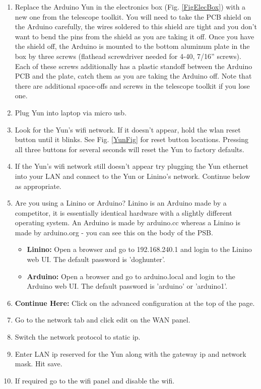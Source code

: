 \documentclass[11pt]{article}
\begin{document}
\label{secYun}
\begin{enumerate}
\item Replace the Arduino Yun in the electronics box (Fig. \ref{FigElecBox}) with a new one from the telescope toolkit.
	You will need to take the PCB shield on the Arduino carefully, the wires soldered to this shield are tight and you don't want to bend the pins from the shield as you are taking it off.
	Once you have the shield off, the Arduino is mounted to the bottom aluminum plate in the box by three screws (flathead screwdriver needed for 4-40, 7/16'' screws).  
	Each of these screws additionally has a plastic standoff between the Arduino PCB and the plate, catch them as you are taking the Arduino off.
	Note that there are additional space-offs and screws in the telescope toolkit if you lose one.
\item Plug Yun into laptop via micro usb.
\item Look for the Yun's wifi network. If it doesn't appear, hold the wlan reset button until it blinks. 
	See Fig. \ref{YunFig} for reset button locations.
	Pressing all three buttons for several seconds will reset the Yun to factory defaults.
\item If the Yun's wifi network still doesn't appear try plugging the Yun ethernet into your LAN and connect to the Yun or Linino's network. Continue below as appropriate.\\
\item Are you using a Linino or Arduino?  Linino is an Arduino made by a competitor, it is essentially identical hardware with a slightly different operating system.
	An Arduino is made by arduino.cc whereas a Linino is made by arduino.org - you can see this on the body of the PSB.
        	\begin{itemize} 
		\item {\textbf{Linino:}} Open a browser and go to 192.168.240.1 and login to the Linino web UI. The default password is 'doghunter'.
		\item {\textbf{Arduino:}} Open a browser and go to arduino.local and login to the Arduino web UI. The default password is 'arduino' or 'arduino1'.
	\end{itemize}
\item \textbf{Continue Here:} Click on the advanced configuration at the top of the page.
\item Go to the network tab and click edit on the WAN panel.
\item Switch the network protocol to static ip.
\item Enter LAN ip reserved for the Yun along with the gateway ip and network mask. Hit save.
\item If required go to the wifi panel and disable the wifi.


\end{enumerate}
\end{document}

